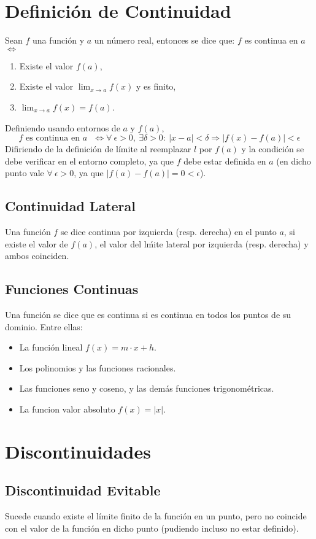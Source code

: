 \documentclass[11pt,a4paper]{article}
\begin{document}
\section{Definici\'on de Continuidad}
Sean $f$ una funci\'on y $a$ un n\'umero real, entonces se dice que: $f$ es continua en $a$ $\iff$
\begin{enumerate}
\item Existe el valor $f(a)$,
\item Existe el valor $\displaystyle{\lim_{x \to a} f(x)}$ y es finito,
\item $\displaystyle{\lim_{x \to a} f(x) = f(a)}$.
\end{enumerate}
Definiendo usando entornos de $a$ y $f(a)$, $$\text{$f$ es continua en $a$ } \iff \forall\ \epsilon > 0,\ \exists \delta > 0 :\ |x-a|<\delta \Rightarrow |f(x)-f(a)| < \epsilon$$
Difiriendo de la definici\'on de l\'imite al reemplazar $l$ por $f(a)$ y la condici\'on se debe verificar en el entorno completo, ya que $f$ debe estar definida en $a$ (en dicho punto vale $\forall\ \epsilon>0$, ya que $|f(a)-f(a)| = 0 < \epsilon$).

\subsection{Continuidad Lateral}
Una funci\'on $f$ se dice continua por izquierda (resp. derecha) en el punto $a$, si existe el valor de $f(a)$, el valor del l\'mite lateral por izquierda (resp. derecha) y ambos coinciden.
\subsection{Funciones Continuas}
Una funci\'on se dice que es continua si es continua en todos los puntos de su dominio. Entre ellas:
\begin{itemize}
\item La funci\'on lineal $f(x)=m\cdot x + h$.
\item Los polinomios y las funciones racionales.
\item Las funciones seno y coseno, y las dem\'as funciones trigonom\'etricas.
\item La funcion valor absoluto $f(x)=|x|$.
\end{itemize}

\section{Discontinuidades}
\subsection{Discontinuidad Evitable}
Sucede cuando existe el l\'imite finito de la funci\'on en un punto, pero no coincide con el valor de la funci\'on en dicho punto (pudiendo incluso no estar definido).
\end{document}
